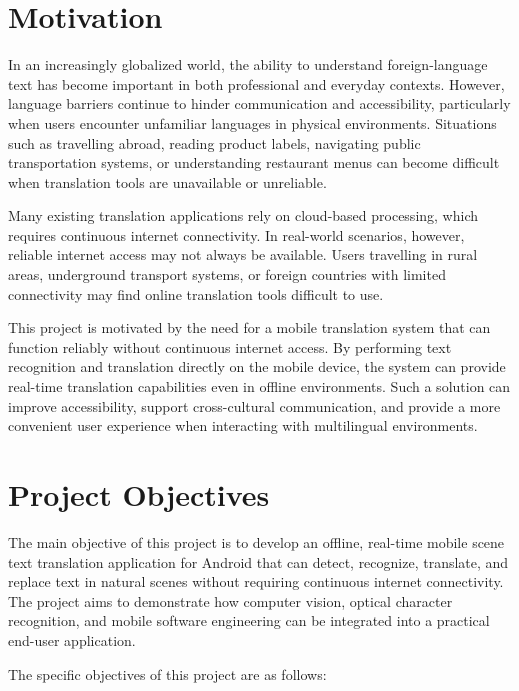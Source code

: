 \section{Motivation}

In an increasingly globalized world, the ability to understand foreign-language text has become important in both professional and everyday contexts. However, language barriers continue to hinder communication and accessibility, particularly when users encounter unfamiliar languages in physical environments. Situations such as travelling abroad, reading product labels, navigating public transportation systems, or understanding restaurant menus can become difficult when translation tools are unavailable or unreliable.

Many existing translation applications rely on cloud-based processing, which requires continuous internet connectivity. In real-world scenarios, however, reliable internet access may not always be available. Users travelling in rural areas, underground transport systems, or foreign countries with limited connectivity may find online translation tools difficult to use.

This project is motivated by the need for a mobile translation system that can function reliably without continuous internet access. By performing text recognition and translation directly on the mobile device, the system can provide real-time translation capabilities even in offline environments. Such a solution can improve accessibility, support cross-cultural communication, and provide a more convenient user experience when interacting with multilingual environments.

\section{Project Objectives}

The main objective of this project is to develop an offline, real-time mobile scene text translation application for Android that can detect, recognize, translate, and replace text in natural scenes without requiring continuous internet connectivity. The project aims to demonstrate how computer vision, optical character recognition, and mobile software engineering can be integrated into a practical end-user application.

The specific objectives of this project are as follows:

